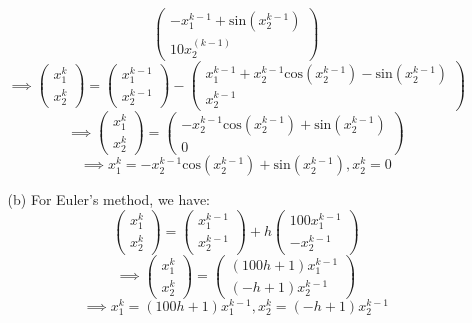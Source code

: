 \documentclass{article}
\begin{document}
\begin{itemize}
\begin{itemize}
\[\begin{pmatrix}
                            -x_1^{k-1}+\text{sin}(x_2^{k-1}) \\
                            10x_2^{(k-1)}
                        \end{pmatrix}\]
                    \[\implies\begin{pmatrix}
                            x_1^k \\x_2^k
                        \end{pmatrix}=\begin{pmatrix}
                            x_1^{k-1} \\x_2^{k-1}
                        \end{pmatrix}-\begin{pmatrix}
                            x_1^{k-1}+x_2^{k-1}\text{cos}(x_2^{k-1})-\text{sin}(x_2^{k-1}) \\
                            x_2^{k-1}
                        \end{pmatrix}\]
                    \[\implies\begin{pmatrix}
                            x_1^k \\x_2^k
                        \end{pmatrix}=\begin{pmatrix}
                            -x_2^{k-1}\text{cos}(x_2^{k-1})+\text{sin}(x_2^{k-1}) \\
                            0
                        \end{pmatrix}\]
                    \[\implies\boxed{x_1^k=-x_2^{k-1}\text{cos}(x_2^{k-1})+\text{sin}(x_2^{k-1}), x_2^k=0}\]
              \item [(b)] For Euler's method, we have:
                    \[\begin{pmatrix}
                            x_1^k \\
                            x_2^k
                        \end{pmatrix}=\begin{pmatrix}
                            x_1^{k-1} \\
                            x_2^{k-1}
                        \end{pmatrix}+h\begin{pmatrix}
                            100x_1^{k-1} \\
                            -x_2^{k-1}
                        \end{pmatrix}\]
                    \[\implies\begin{pmatrix}
                            x_1^k \\
                            x_2^k
                        \end{pmatrix}=\begin{pmatrix}
                            (100h+1)x_1^{k-1} \\
                            (-h+1)x_2^{k-1}
                        \end{pmatrix}\]
                    \[\implies\boxed{x_1^k=(100h+1)x_1^{k-1}, x_2^k=(-h+1)x_2^{k-1}}\]


\end{itemize}
\end{itemize}
\end{document}
